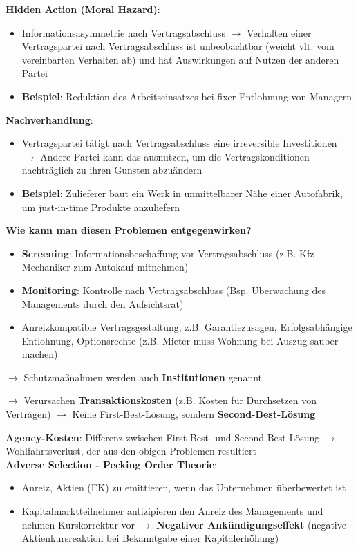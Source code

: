 \textbf{Hidden Action (Moral Hazard)}:
\begin{itemize}
	\item Informationsasymmetrie nach Vertragsabschluss $\rightarrow$ Verhalten einer Vertragspartei nach Vertragsabschluss ist unbeobachtbar (weicht vlt. vom vereinbarten Verhalten ab) und hat Auswirkungen auf Nutzen der anderen Partei
	\item \textbf{Beispiel}: Reduktion des Arbeitseinsatzes bei fixer Entlohnung von Managern
\end{itemize}

\textbf{Nachverhandlung}:
\begin{itemize}
	\item Vertragspartei tätigt nach Vertragsabschluss eine irreversible Investitionen $\rightarrow$ Andere Partei kann das ausnutzen, um die Vertragskonditionen nachträglich zu ihren Gunsten abzuändern
	\item \textbf{Beispiel}: Zulieferer baut ein Werk in unmittelbarer Nähe einer Autofabrik, um just-in-time	Produkte anzuliefern
\end{itemize}
\bigskip
\textbf{Wie kann man diesen Problemen entgegenwirken?}

\begin{itemize}
	\item \textbf{Screening}: Informationsbeschaffung vor Vertragsabschluss (z.B. Kfz-Mechaniker zum Autokauf mitnehmen)
	\item \textbf{Monitoring}: Kontrolle nach Vertragsabschluss (Bsp. Überwachung des Managements durch den Aufsichtsrat)
	\item Anreizkompatible Vertragsgestaltung, z.B. Garantiezusagen, Erfolgsabhängige Entlohnung, Optionsrechte (z.B. Mieter muss Wohnung bei Auszug sauber machen)
\end{itemize}

$\rightarrow$ Schutzmaßnahmen werden auch \textbf{Institutionen} genannt

$\rightarrow$ Verursachen \textbf{Transaktionskosten} (z.B. Kosten für Durchsetzen von Verträgen) $\rightarrow$ Keine First-Best-Lösung, sondern \textbf{Second-Best-Lösung}

\textbf{Agency-Kosten}: Differenz zwischen First-Best- und Second-Best-Lösung $\rightarrow$ Wohlfahrtsverlust, der aus den obigen Problemen resultiert\\

\textbf{Adverse Selection - Pecking Order Theorie}:
\begin{itemize}
	\item Anreiz, Aktien (EK) zu emittieren, wenn das Unternehmen überbewertet ist
	\item Kapitalmarktteilnehmer antizipieren den Anreiz des Managements und nehmen Kurskorrektur vor $\rightarrow$ \textbf{Negativer Ankündigungseffekt} (negative Aktienkursreaktion bei Bekanntgabe einer Kapitalerhöhung)
\end{itemize}

